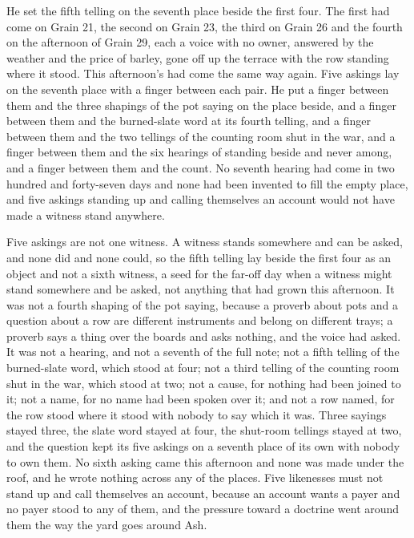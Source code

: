 He set the fifth telling on the seventh place beside the first four. The first had come on Grain 21, the second on Grain 23, the third on Grain 26 and the fourth on the afternoon of Grain 29, each a voice with no owner, answered by the weather and the price of barley, gone off up the terrace with the row standing where it stood. This afternoon's had come the same way again. Five askings lay on the seventh place with a finger between each pair. He put a finger between them and the three shapings of the pot saying on the place beside, and a finger between them and the burned-slate word at its fourth telling, and a finger between them and the two tellings of the counting room shut in the war, and a finger between them and the six hearings of  standing beside and never among, and a finger between them and the count. No seventh hearing had come in two hundred and forty-seven days and none had been invented to fill the empty place, and five askings standing up and calling themselves an account would not have made a witness stand anywhere.

Five askings are not one witness. A witness stands somewhere and can be asked, and none did and none could, so the fifth telling lay beside the first four as an object and not a sixth witness, a seed for the far-off day when a witness might stand somewhere and be asked, not anything that had grown this afternoon. It was not a fourth shaping of the pot saying, because a proverb about pots and a question about a row are different instruments and belong on different trays; a proverb says a thing over the boards and asks nothing, and the voice had asked. It was not a hearing, and not a seventh of the full note; not a fifth telling of the burned-slate word, which stood at four; not a third telling of the counting room shut in the war, which stood at two; not a cause, for nothing had been joined to it; not a name, for no name had been spoken over it; and not a row named, for the row stood where it stood with nobody to say which it was. Three sayings stayed three, the slate word stayed at four, the shut-room tellings stayed at two, and the question kept its five askings on a seventh place of its own with nobody to own them. No sixth asking came this afternoon and none was made under the roof, and he wrote nothing across any of the places. Five likenesses must not stand up and call themselves an account, because an account wants a payer and no payer stood to any of them, and the pressure toward a doctrine went around them the way the yard goes around Ash.

